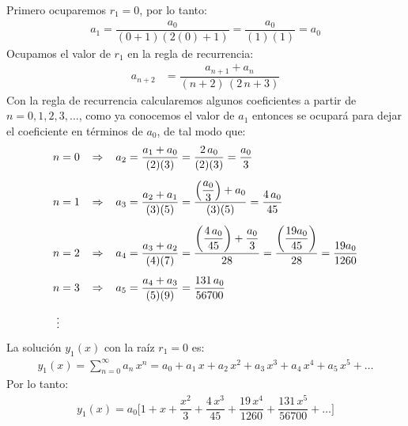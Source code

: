 \par
Primero ocuparemos $r_{1} = 0$, por lo tanto:
\begin{align*}
a_{1} = \dfrac{a_{0}}{(0+1)(2(0)+1)} = \dfrac{a_{0}}{(1)(1)} = a_{0}
\end{align*}
Ocupamos el valor de $r_{1}$ en la regla de recurrencia:
\begin{align*}
a_{n+2} &= \dfrac{a_{n+1} + a_{n}}{(n + 2) \, (2 \, n + 3)}
\end{align*}
Con la regla de recurrencia calcularemos algunos coeficientes a partir de $n = 0, 1, 2, 3, \ldots$, como ya conocemos el valor de $a_{1}$ entonces se ocupará para dejar el coeficiente en términos de $a_{0}$, de tal modo que:
\begin{align*}
n &= 0 \hspace{0.3cm} \Rightarrow \hspace{0.3cm} a_{2} = \dfrac{a_{1} + a_{0}}{(2)(3)} = \dfrac{2 \, a_{0}}{(2)(3)} = \dfrac{a_{0}}{3} \\[0.5em]
n &= 1 \hspace{0.3cm} \Rightarrow \hspace{0.3cm} a_{3} = \dfrac{a_{2} + a_{1}}{(3)(5)} = \dfrac{\left( \dfrac{a_{0}}{3} \right) + a_{0}}{(3)(5)} = \dfrac{4 \, a_{0}}{45} \\[0.5em]
n &= 2 \hspace{0.3cm} \Rightarrow \hspace{0.3cm} a_{4} = \dfrac{a_{3} + a_{2}}{(4)(7)} = \dfrac{\left( \dfrac{4 \, a_{0}}{45} \right) + \dfrac{a_{0}}{3}}{28} = \dfrac{ \left( \dfrac{19 a_{0}}{45}\right)}{28} = \dfrac{19 a_{0}}{1260} \\[0.5em]
n &= 3 \hspace{0.3cm} \Rightarrow \hspace{0.3cm} a_{5} = \dfrac{a_{4} + a_{3}}{(5)(9)} = \dfrac{131 \, a_{0}}{56700} \\[0.5em]
\vdots
\end{align*}
La solución $y_{1}(x)$ con la raíz $r_{1} = 0$ es:
\begin{align*}
y_{1}(x) = \sum_{n=0}^{\infty} a_{n} \, x^{n} = a_{0} + a_{1} \, x + a_{2} \, x^{2} + a_{3} \, x^{3} + a_{4} \, x^{4} + a_{5} \, x^{5} + \ldots
\end{align*}
Por lo tanto:
\begin{align}
y_{1}(x) = a_{0} \bigg[ 1 + x + \dfrac{x^{2}}{3}  + \dfrac{4 \, x^{3}}{45} + \dfrac{19 \, x^{4}}{1260} + \dfrac{131 \, x^{5}}{56700} + \ldots \bigg]
\label{eq:ecuacion_soluciony1}
\end{align}
